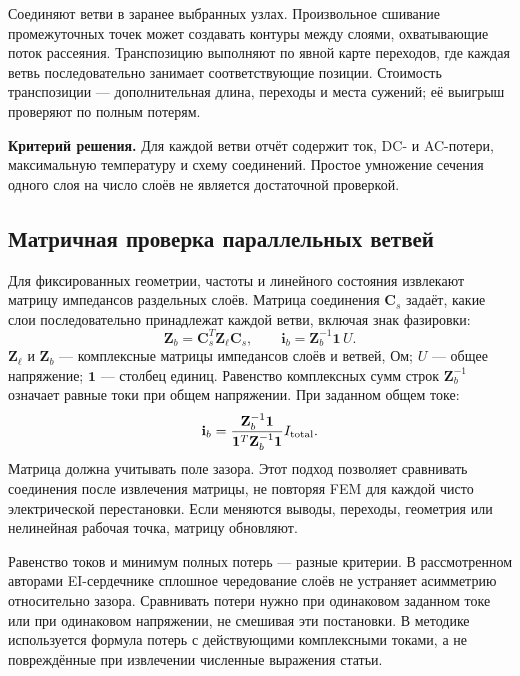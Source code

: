 \documentclass[14pt,a4paper]{extarticle}
\newcommand{\criterion}{\par\noindent\textbf{Критерий решения.} }
\begin{document}
Соединяют ветви в заранее выбранных узлах. Произвольное сшивание промежуточных точек может создавать контуры между слоями, охватывающие поток рассеяния. Транспозицию выполняют по явной карте переходов, где каждая ветвь последовательно занимает соответствующие позиции. Стоимость транспозиции --- дополнительная длина, переходы и места сужений; её выигрыш проверяют по полным потерям.

\criterion Для каждой ветви отчёт содержит ток, DC- и AC-потери, максимальную температуру и схему соединений. Простое умножение сечения одного слоя на число слоёв не является достаточной проверкой.

\subsection{Матричная проверка параллельных ветвей}
Для фиксированных геометрии, частоты и линейного состояния извлекают матрицу импедансов раздельных слоёв. Матрица соединения $\mathbf C_s$ задаёт, какие слои последовательно принадлежат каждой ветви, включая знак фазировки:
\begin{equation}
 \mathbf Z_b=\mathbf C_s^T\mathbf Z_{\ell}\mathbf C_s,\qquad
 \mathbf i_b=\mathbf Z_b^{-1}\mathbf 1\,U.
 \label{eq:parallel-branch-matrix}
\end{equation}
$\mathbf Z_{\ell}$ и $\mathbf Z_b$ --- комплексные матрицы импедансов слоёв и ветвей, Ом; $U$ --- общее напряжение; $\mathbf 1$ --- столбец единиц. Равенство комплексных сумм строк $\mathbf Z_b^{-1}$ означает равные токи при общем напряжении. При заданном общем токе:
\begin{equation}
 \mathbf i_b=\frac{\mathbf Z_b^{-1}\mathbf 1}{\mathbf 1^T\mathbf Z_b^{-1}\mathbf 1}I_{\rm total}.
 \label{eq:parallel-fixed-current}
\end{equation}
Матрица должна учитывать поле зазора. Этот подход позволяет сравнивать соединения после извлечения матрицы, не повторяя FEM для каждой чисто электрической перестановки. Если меняются выводы, переходы, геометрия или нелинейная рабочая точка, матрицу обновляют.\cite[разделы IV--V]{doi35}

Равенство токов и минимум полных потерь --- разные критерии. В рассмотренном авторами EI-сердечнике сплошное чередование слоёв не устраняет асимметрию относительно зазора. Сравнивать потери нужно при одинаковом заданном токе или при одинаковом напряжении, не смешивая эти постановки. В методике используется формула потерь с действующими комплексными токами, а не повреждённые при извлечении численные выражения статьи.
\end{document}
